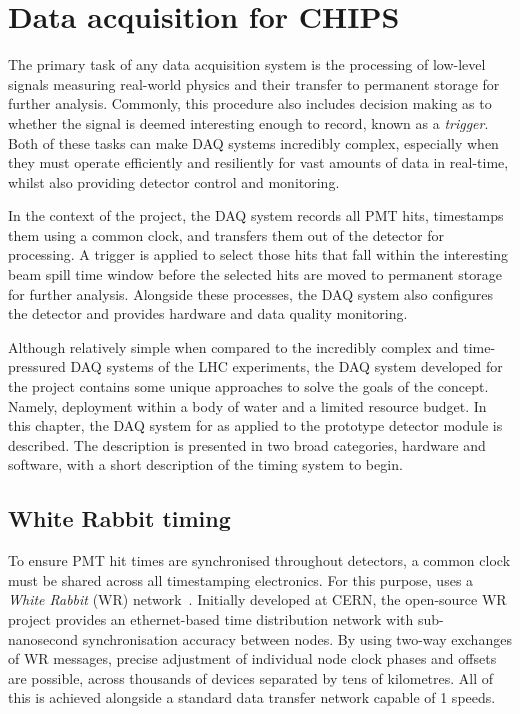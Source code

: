 \chapter{Data acquisition for CHIPS} %
\label{chap:daq} %

The primary task of any data acquisition system is the processing of low-level signals measuring
real-world physics and their transfer to permanent storage for further analysis. Commonly, this
procedure also includes decision making as to whether the signal is deemed interesting enough to
record, known as a \emph{trigger}. Both of these tasks can make DAQ systems incredibly complex,
especially when they must operate efficiently and resiliently for vast amounts of data in
real-time, whilst also providing detector control and monitoring.

In the context of the \chips project, the DAQ system records all PMT hits, timestamps them using a
common clock, and transfers them out of the detector for processing. A trigger is applied to
select those hits that fall within the interesting \numi beam spill time window before the
selected hits are moved to permanent storage for further analysis. Alongside these processes, the
DAQ system also configures the detector and provides hardware and data quality monitoring.

Although relatively simple when compared to the incredibly complex and time-pressured DAQ systems
of the LHC experiments, the DAQ system developed for the \chips project contains some unique
approaches to solve the goals of the \chips concept. Namely, deployment within a body of water and
a limited resource budget. In this chapter, the DAQ system for \chips as applied to the \chipsfive
prototype detector module is described. The description is presented in two broad categories,
hardware and software, with a short description of the timing system to begin.

\section{White Rabbit timing} %
\label{sec:daq_timing} %

To ensure PMT hit times are synchronised throughout \chips detectors, a common clock must be
shared across all timestamping electronics. For this purpose, \chips uses a \emph{White Rabbit}
(WR) network~\cite{lipinski2011}. Initially developed at CERN, the open-source WR project provides
an ethernet-based time distribution network with sub-nanosecond synchronisation accuracy between
nodes. By using two-way exchanges of WR messages, precise adjustment of individual node clock
phases and offsets are possible, across thousands of devices separated by tens of kilometres. All
of this is achieved alongside a standard data transfer network capable of \SI{1}{}
speeds.

